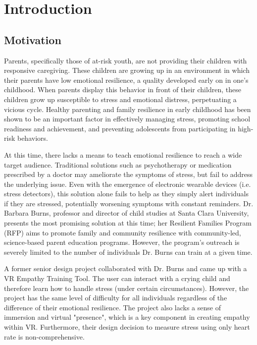 \chapter{Introduction} %

\section{Motivation}


Parents, specifically those of at-risk youth, are not providing their children with responsive caregiving. 
These children are growing up in an environment in which their parents have low emotional resilience, a quality developed early on in one's childhood. 
When parents display this behavior in front of their children, these children grow up susceptible to stress and emotional distress, perpetuating a vicious cycle. 
Healthy parenting and family resilience in early childhood has been shown to be an important factor in effectively managing stress, promoting school readiness and achievement, and preventing adolescents from participating in high-risk behaviors.

At this time, there lacks a means to teach emotional resilience to reach a wide target audience. 
Traditional solutions such as psychotherapy or medication prescribed by a doctor may ameliorate the symptoms of stress, but fail to address the underlying issue. 
Even with the emergence of electronic wearable devices (i.e. stress detectors), this solution alone fails to help as they simply alert individuals if they are stressed, potentially worsening symptoms with constant reminders. 
Dr. Barbara Burns, professor and director of child studies at Santa Clara University, presents the most promising solution at this time; her Resilient Families Program (RFP) aims to promote family and community resilience with community-led, science-based parent education programs.
However, the program's outreach is severely limited to the number of individuals Dr. Burns can train at a given time. 

A former senior design project collaborated with Dr. Burns and came up with a VR Empathy Training Tool. 
The user can interact with a crying child and therefore learn how to handle stress (under certain circumstances). 
However, the project has the same level of difficulty for all individuals regardless of the difference of their emotional resilience. 
The project also lacks a sense of immersion and virtual "presence", which is a key component in creating empathy within VR. 
Furthermore, their design decision to measure stress using only heart rate is non-comprehensive.

